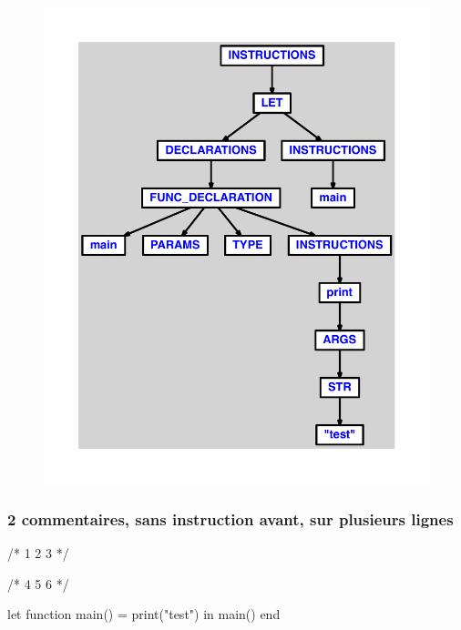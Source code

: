 \documentclass{article}
\begin{document}
\begin{figure}[H]\centering\includegraphics[max width=\textwidth]{ast/ast_154.pdf}\end{figure}\subsubsection{2 commentaires, sans instruction avant, sur plusieurs lignes}
\begin{verbatimtab}
/*
1
2
3
*/

/*
4
5
6
*/

let
	function main() = print("test")
in main() end
\end{verbatimtab}
\end{document}

